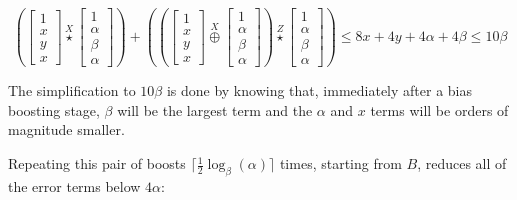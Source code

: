 \documentclass[onecolumn,unpublished,a4paper]{quantumarticle}
\theoremstyle{definition}
\theoremstyle{definition}
\theoremstyle{definition}
\begin{document}
\begin{equation}
\left(\begin{bmatrix}1\\x\\y\\x\end{bmatrix}
\stackrel{X}{\star}
\begin{bmatrix}1\\\alpha\\\beta\\\alpha\end{bmatrix}
\right)
+
\left(
\left(
\begin{bmatrix}1\\x\\y\\x\end{bmatrix}
\stackrel{X}{\oplus}
\begin{bmatrix}1\\\alpha\\\beta\\\alpha\end{bmatrix}
\right)
\stackrel{Z}{\star}
\begin{bmatrix}1\\\alpha\\\beta\\\alpha\end{bmatrix}
\right)
\leq
8x + 4y + 4\alpha + 4\beta 
\leq
10\beta
\end{equation}

The simplification to $10\beta$ is done by knowing that, immediately after a bias boosting stage, $\beta$ will be the largest term and the $\alpha$ and $x$ terms will be orders of magnitude smaller.

Repeating this pair of boosts $\lceil \frac{1}{2}\log_\beta(\alpha) \rceil$ times, starting from $B$, reduces all of the error terms below $4\alpha$:
\end{document}
